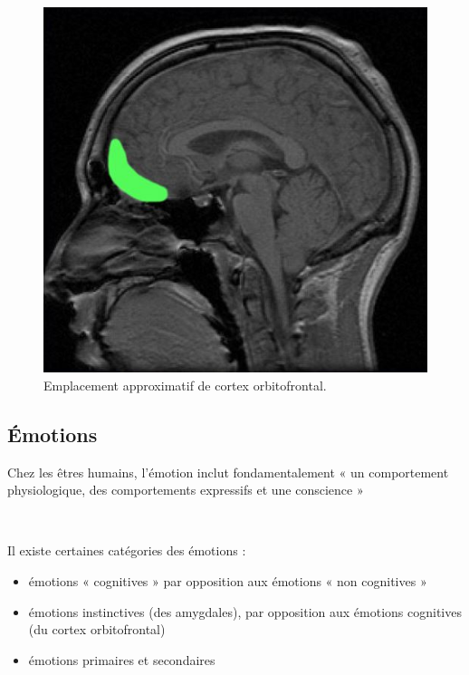 \begin{figure}[th]
\centering
\includegraphics{Figures/3}
\decoRule
\caption[Cortex Orbifrontal]{Emplacement approximatif de cortex orbitofrontal.}
\label{fig:cortex}
\end{figure}


\subsection{Émotions}

Chez les êtres humains, l'émotion inclut fondamentalement « un comportement physiologique, des comportements expressifs et une conscience » \parencite{myers2004theories}

~\par
Il existe certaines catégories des émotions :

\begin{itemize}
\item émotions « cognitives » par opposition aux émotions « non cognitives »
\item émotions instinctives (des amygdales), par opposition aux émotions cognitives (du cortex orbitofrontal)
\item émotions primaires et secondaires
\end{itemize}

~\par

